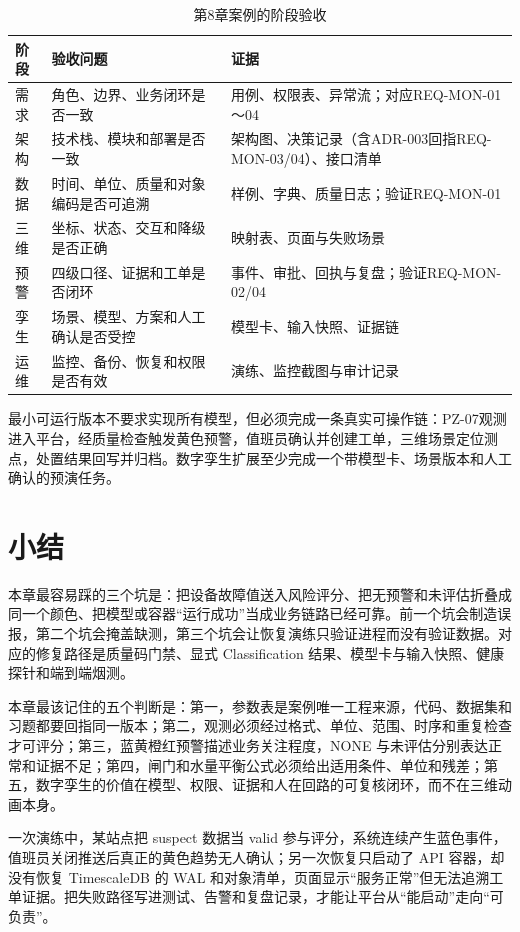 \begin{table}[htbp]
\centering
\caption{第8章案例的阶段验收}
\label{tab:chapter8-acceptance}
\begin{tabular}{p{2.0cm}p{5.0cm}p{5.4cm}}
\toprule
阶段 & 验收问题 & 证据 \\
\midrule
需求 & 角色、边界、业务闭环是否一致 & 用例、权限表、异常流；对应REQ-MON-01～04 \\
架构 & 技术栈、模块和部署是否一致 & 架构图、决策记录（含ADR-003回指REQ-MON-03/04）、接口清单 \\
数据 & 时间、单位、质量和对象编码是否可追溯 & 样例、字典、质量日志；验证REQ-MON-01 \\
三维 & 坐标、状态、交互和降级是否正确 & 映射表、页面与失败场景 \\
预警 & 四级口径、证据和工单是否闭环 & 事件、审批、回执与复盘；验证REQ-MON-02/04 \\
孪生 & 场景、模型、方案和人工确认是否受控 & 模型卡、输入快照、证据链 \\
运维 & 监控、备份、恢复和权限是否有效 & 演练、监控截图与审计记录 \\
\bottomrule
\end{tabular}
\end{table}

最小可运行版本不要求实现所有模型，但必须完成一条真实可操作链：PZ-07观测进入平台，经质量检查触发黄色预警，值班员确认并创建工单，三维场景定位测点，处置结果回写并归档。数字孪生扩展至少完成一个带模型卡、场景版本和人工确认的预演任务。

\section*{小结}

本章最容易踩的三个坑是：把设备故障值送入风险评分、把无预警和未评估折叠成同一个颜色、把模型或容器“运行成功”当成业务链路已经可靠。前一个坑会制造误报，第二个坑会掩盖缺测，第三个坑会让恢复演练只验证进程而没有验证数据。对应的修复路径是质量码门禁、显式 Classification 结果、模型卡与输入快照、健康探针和端到端烟测。

本章最该记住的五个判断是：第一，参数表是案例唯一工程来源，代码、数据集和习题都要回指同一版本；第二，观测必须经过格式、单位、范围、时序和重复检查才可评分；第三，蓝黄橙红预警描述业务关注程度，NONE 与未评估分别表达正常和证据不足；第四，闸门和水量平衡公式必须给出适用条件、单位和残差；第五，数字孪生的价值在模型、权限、证据和人在回路的可复核闭环，而不在三维动画本身。

一次演练中，某站点把 suspect 数据当 valid 参与评分，系统连续产生蓝色事件，值班员关闭推送后真正的黄色趋势无人确认；另一次恢复只启动了 API 容器，却没有恢复 TimescaleDB 的 WAL 和对象清单，页面显示“服务正常”但无法追溯工单证据。把失败路径写进测试、告警和复盘记录，才能让平台从“能启动”走向“可负责”。


